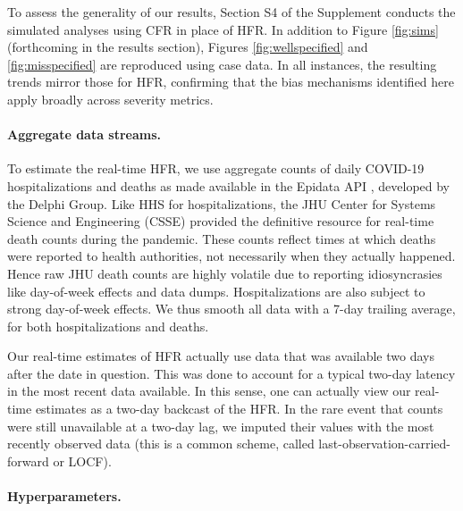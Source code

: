 \documentclass{article}
\begin{document}

To assess the generality of our results, Section S4 of the Supplement conducts the simulated analyses using CFR in place of HFR. 
In addition to Figure \ref{fig:sims} (forthcoming in the results section), Figures \ref{fig:wellspecified} and \ref{fig:misspecified} are reproduced using case data. 
In all instances, the resulting trends mirror those for HFR, confirming that the bias mechanisms identified here apply broadly across severity metrics. 

\paragraph{Aggregate data streams.}

To estimate the real-time HFR, we use aggregate counts of daily COVID-19 
hospitalizations and deaths as made available in the Epidata API
\citep{Epidata}, developed by the Delphi Group. Like HHS for hospitalizations,
the JHU Center for Systems Science and Engineering (CSSE) provided the
definitive resource for real-time death counts during the pandemic. These counts
reflect times at which deaths were reported to health authorities, not
necessarily when they actually happened. Hence raw JHU death counts are highly
volatile due to reporting idiosyncrasies like day-of-week effects and data
dumps. Hospitalizations are also subject to strong day-of-week effects. We
thus smooth all data with a 7-day trailing average, for both hospitalizations
and deaths.   

Our real-time estimates of HFR actually use data that was available two days
after the date in question. This was done to account for a typical two-day
latency in the most recent data available. In this sense, one can actually view
our real-time estimates as a two-day backcast of the HFR. In the rare event that
counts were still unavailable at a two-day lag, we imputed their values with the
most recently observed data (this is a common scheme, called
last-observation-carried-forward or LOCF).        

\paragraph{Hyperparameters.}
\end{document}
